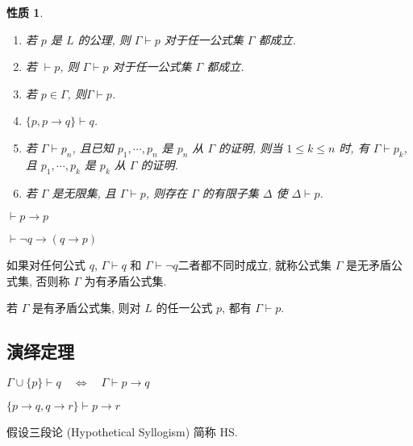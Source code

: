 \documentclass[
    mode=hazy,
    color=blue,
    device=normal,
    lang=cn
]{elegantnote}
\newtheorem{quality}{性质}[section]
\begin{document}
        \begin{quality}
            \begin{enumerate}[label = $\arabic*^\circ$]
                \item 若 $p$ 是 $L$ 的公理, 则 $\Gamma\vdash p$ 对于任一公式集 $\Gamma$ 都成立.
                \item 若 $\vdash p$, 则 $\Gamma\vdash p$ 对于任一公式集 $\Gamma$ 都成立.
                \item 若 $p\in\Gamma$, 则$\Gamma\vdash p$.
                \item $\{p,p\to q\}\vdash q$.
                \item 若 $\Gamma\vdash p_n$, 且已知 $p_1,\cdots, p_n$ 是 $p_n$ 从 $\Gamma$ 的证明, 则当 $1\leq k\leq n$ 时, 有 $\Gamma \vdash p_k$, 且 $p_1, \cdots, p_k$ 是 $p_k$ 从 $\Gamma$ 的证明.
                \item 若 $\Gamma$ 是无限集, 且 $\Gamma\vdash p$, 则存在 $\Gamma$ 的有限子集 $\Delta$ 使 $\Delta\vdash p$.
            \end{enumerate}
        \end{quality}
        \begin{proposition}[同一律] 
            $\vdash p\to p$
        \end{proposition}
        \begin{proposition}[否定前件律] 
            $\vdash\lnot q\to(q\to p)$
        \end{proposition}
        \begin{definition}[无矛盾公式集]
            如果对任何公式 $q$, $\Gamma\vdash q$ 和 $\Gamma\vdash\lnot q$二者都不同时成立, 就称公式集 $\Gamma$ 是无矛盾公式集, 否则称 $\Gamma$ 为有矛盾公式集.
        \end{definition}
        \begin{proposition}
            若 $\Gamma$ 是有矛盾公式集, 则对 $L$ 的任一公式 $p$, 都有 $\Gamma\vdash p$.
        \end{proposition}
        \subsection{演绎定理}
        \begin{theorem}[演绎定理]
            $\Gamma \cup \{p\}\vdash q\quad\Leftrightarrow\quad \Gamma\vdash p\to q$
        \end{theorem}
        \begin{lemma}[假设三段论]
            $\{p\to q,q\to r\}\vdash p\to r$
        \end{lemma}
        假设三段论 (Hypothetical Syllogism) 简称 HS.
\end{document}
